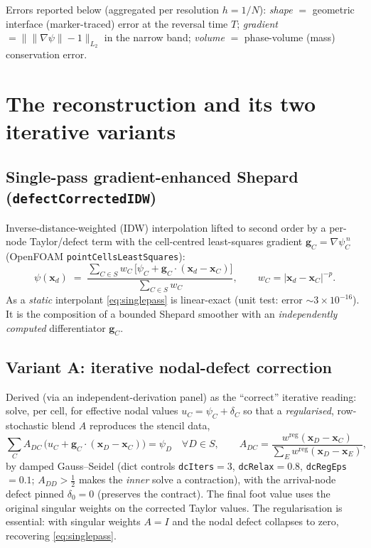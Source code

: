 \documentclass[11pt]{article}
\newcommand{\gradpsi}{\lVert\nabla\psi\rVert}
\newcommand{\code}[1]{\texttt{#1}}
\begin{document}
Errors reported below (aggregated per resolution $h=1/N$):
\emph{shape} $=$ geometric interface (marker-traced) error at the reversal time $T$;
\emph{gradient} $=\lVert\gradpsi-1\rVert_{L_2}$ in the narrow band;
\emph{volume} $=$ phase-volume (mass) conservation error.

\section{The reconstruction and its two iterative variants}

\subsection{Single-pass gradient-enhanced Shepard (\code{defectCorrectedIDW})}
Inverse-distance-weighted (IDW) interpolation lifted to second order by a per-node
Taylor/defect term with the cell-centred least-squares gradient
$\mathbf{g}_C=\nabla\psi^{\,n}_C$ (OpenFOAM \code{pointCellsLeastSquares}):
\begin{equation}
\psi(\mathbf{x}_d) \;=\;
\frac{\sum_{C\in S} w_C\,\big[\psi_C + \mathbf{g}_C\!\cdot(\mathbf{x}_d-\mathbf{x}_C)\big]}
     {\sum_{C\in S} w_C},
\qquad w_C=\lvert \mathbf{x}_d-\mathbf{x}_C\rvert^{-p}.
\label{eq:singlepass}
\end{equation}
As a \emph{static} interpolant \eqref{eq:singlepass} is linear-exact (unit test:
error $\sim 3\times10^{-16}$). It is the composition of a bounded Shepard smoother
with an \emph{independently computed} differentiator $\mathbf{g}_C$.

\subsection{Variant A: iterative nodal-defect correction}
Derived (via an independent-derivation panel) as the ``correct'' iterative reading:
solve, per cell, for effective nodal values $u_C=\psi_C+\delta_C$ so that a
\emph{regularised}, row-stochastic blend $A$ reproduces the stencil data,
\begin{equation}
\sum_{C} A_{DC}\,\big(u_C + \mathbf{g}_C\!\cdot(\mathbf{x}_D-\mathbf{x}_C)\big)=\psi_D
\quad\forall D\in S,
\qquad
A_{DC}=\frac{w^{\mathrm{reg}}(\mathbf{x}_D-\mathbf{x}_C)}{\sum_E w^{\mathrm{reg}}(\mathbf{x}_D-\mathbf{x}_E)},
\end{equation}
by damped Gauss--Seidel (dict controls \code{dcIters}$=3$, \code{dcRelax}$=0.8$,
\code{dcRegEps}$=0.1$; $A_{DD}>\tfrac12$ makes the \emph{inner} solve a contraction),
with the arrival-node defect pinned $\delta_0=0$ (preserves the contract). The final
foot value uses the original singular weights on the corrected Taylor values. The
regularisation is essential: with singular weights $A=I$ and the nodal defect
collapses to zero, recovering \eqref{eq:singlepass}.
\end{document}
